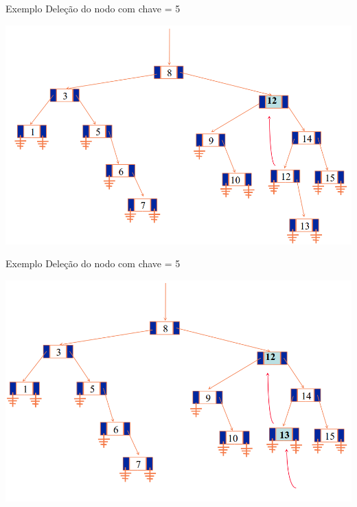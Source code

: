 \documentclass[12pt,table,xcolor={dvipsnames}]{beamer}
\begin{document}
\begin{frame}[fragile]{Exemplo}
Deleção do nodo com chave = 5
\begin{center}
\includegraphics[scale=.3]{arv14.png} 
\end{center}
\end{frame}

\begin{frame}[fragile]{Exemplo}
Deleção do nodo com chave = 5
\begin{center}
\includegraphics[scale=.3]{arv15.png} 
\end{center}
\end{frame}
\end{document}
